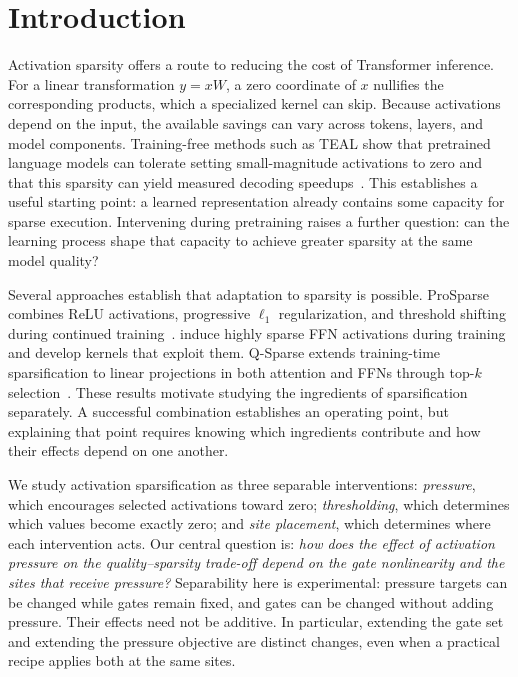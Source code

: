 \section{Introduction}
\label{sec:introduction}

Activation sparsity offers a route to reducing the cost of Transformer inference.
For a linear transformation $y=xW$, a zero coordinate of $x$ nullifies the
corresponding products, which a specialized kernel can skip. Because activations
depend on the input, the available savings can vary across tokens, layers, and
model components. Training-free methods such as TEAL show that pretrained
language models can tolerate setting small-magnitude activations to zero and
that this sparsity can yield measured decoding speedups~\citep{liu2024teal}.
This establishes a useful starting point: a learned representation already
contains some capacity for sparse execution. Intervening during pretraining
raises a further question: can the learning process shape that capacity to
achieve greater sparsity at the same model quality?

Several approaches establish that adaptation to sparsity is possible.
ProSparse combines ReLU activations, progressive $\ell_1$ regularization, and
threshold shifting during continued training~\citep{song2024prosparse}.
\citet{cetin2026sparser} induce highly sparse FFN activations during training
and develop kernels that exploit them. Q-Sparse extends training-time
sparsification to linear projections in both attention and FFNs through
top-$k$ selection~\citep{wang2024qsparse}. These results motivate studying the
ingredients of sparsification separately. A successful combination establishes
an operating point, but explaining that point requires knowing which ingredients
contribute and how their effects depend on one another.

We study activation sparsification as three separable interventions:
\emph{pressure}, which encourages selected activations toward zero;
\emph{thresholding}, which determines which values become exactly zero; and
\emph{site placement}, which determines where each intervention acts.
Our central question is: \emph{how does the effect of activation pressure on
the quality--sparsity trade-off depend on the gate nonlinearity and the sites
that receive pressure?} Separability here is experimental: pressure targets
can be changed while gates remain fixed, and gates can be changed without
adding pressure. Their effects need not be additive. In particular, extending
the gate set and extending the pressure objective are distinct changes, even
when a practical recipe applies both at the same sites.

